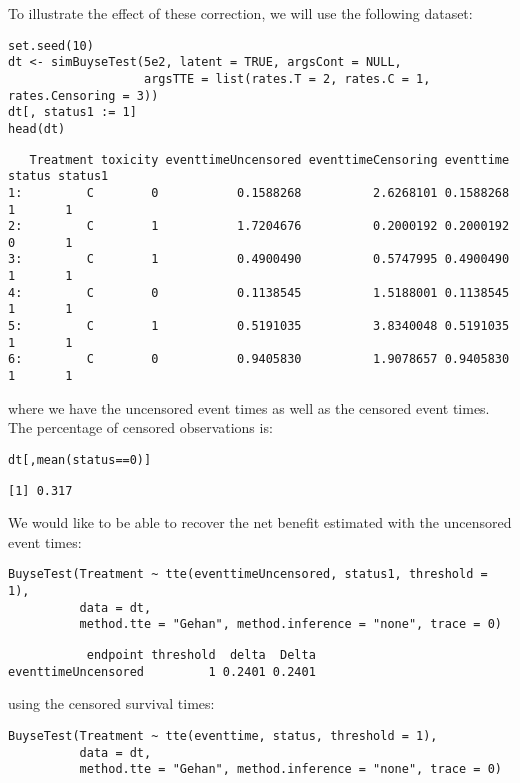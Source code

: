 \documentclass[12pt]{article}
\begin{document}
\bigskip

To illustrate the effect of these correction, we will use the
following dataset:
\lstset{language=r,label= ,caption= ,captionpos=b,numbers=none}
\begin{lstlisting}
set.seed(10)
dt <- simBuyseTest(5e2, latent = TRUE, argsCont = NULL,
				   argsTTE = list(rates.T = 2, rates.C = 1, rates.Censoring = 3))
dt[, status1 := 1]
head(dt)
\end{lstlisting}

\begin{verbatim}
   Treatment toxicity eventtimeUncensored eventtimeCensoring eventtime status status1
1:         C        0           0.1588268          2.6268101 0.1588268      1       1
2:         C        1           1.7204676          0.2000192 0.2000192      0       1
3:         C        1           0.4900490          0.5747995 0.4900490      1       1
4:         C        0           0.1138545          1.5188001 0.1138545      1       1
5:         C        1           0.5191035          3.8340048 0.5191035      1       1
6:         C        0           0.9405830          1.9078657 0.9405830      1       1
\end{verbatim}

where we have the uncensored event times as well as the censored event
times. The percentage of censored observations is:
\lstset{language=r,label= ,caption= ,captionpos=b,numbers=none}
\begin{lstlisting}
dt[,mean(status==0)]
\end{lstlisting}

\begin{verbatim}
[1] 0.317
\end{verbatim}

We would like to be able to recover the net benefit estimated with the uncensored event times:
\lstset{language=r,label= ,caption= ,captionpos=b,numbers=none}
\begin{lstlisting}
BuyseTest(Treatment ~ tte(eventtimeUncensored, status1, threshold = 1),
		  data = dt,
		  method.tte = "Gehan", method.inference = "none", trace = 0)
\end{lstlisting}

\begin{verbatim}
           endpoint threshold  delta  Delta
eventtimeUncensored         1 0.2401 0.2401
\end{verbatim}

using the censored survival times:
\lstset{language=r,label= ,caption= ,captionpos=b,numbers=none}
\begin{lstlisting}
BuyseTest(Treatment ~ tte(eventtime, status, threshold = 1),
		  data = dt,
		  method.tte = "Gehan", method.inference = "none", trace = 0)
\end{lstlisting}
\end{document}
